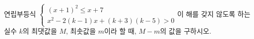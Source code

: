 연립부등식 $\begin{cases} (x+1)^2\le x+7 \\ x^2-2(k-1)x+(k+3)(k-5)>0 \end{cases}$이 해를 갖지 않도록 하는 실수 $k$의 최댓값을 $M$, 최솟값을 $m$이라 할 때, $M-m$의 값을 구하시오.
